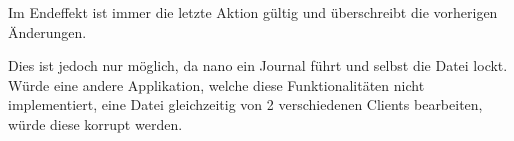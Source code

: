 Im Endeffekt ist immer die letzte Aktion gültig und überschreibt die vorherigen Änderungen.

Dies ist jedoch nur möglich, da nano ein Journal führt und selbst die Datei lockt. Würde eine andere Applikation, welche diese Funktionalitäten nicht implementiert, eine Datei gleichzeitig von 2 verschiedenen Clients bearbeiten, würde diese korrupt werden.